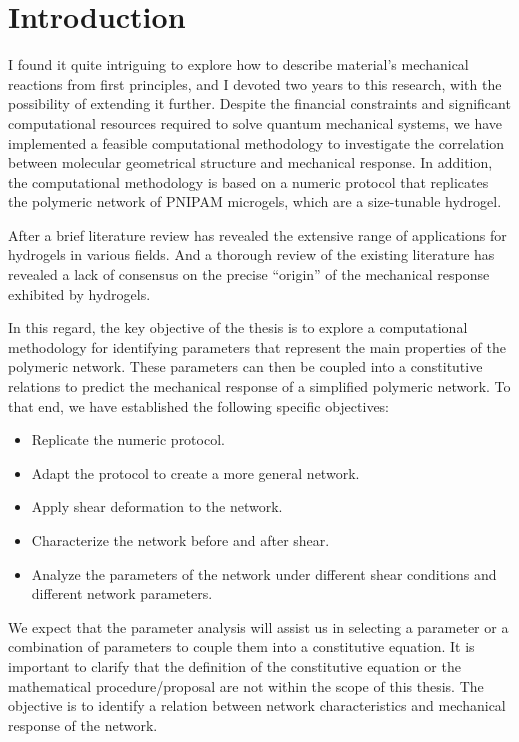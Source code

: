 \chapter{Introduction}\label{ch1:Intro}



I found it quite intriguing to explore how to describe material's mechanical reactions from first principles, and I devoted two years to this research, with the possibility of extending it further.
Despite the financial constraints and significant computational resources required to solve quantum mechanical systems, we have implemented a feasible computational methodology to investigate the correlation between molecular geometrical structure and mechanical response.
In addition, the computational methodology is based on a numeric protocol that replicates the polymeric network of PNIPAM microgels, which are a size-tunable hydrogel.

After a brief literature review has revealed the extensive range of applications for hydrogels in various fields.
And a thorough review of the existing literature has revealed a lack of consensus on the precise ``origin'' of the mechanical response exhibited by hydrogels.

In this regard, the key objective of the thesis is to explore a computational methodology for identifying parameters that represent the main properties of the polymeric network. 
These parameters can then be coupled into a constitutive relations to predict the mechanical response of a simplified polymeric network.
To that end, we have established the following specific objectives:
\begin{itemize}
    \item Replicate the numeric protocol.
    \item Adapt the protocol to create a more general network.
    \item Apply shear deformation to the network.
    \item Characterize the network before and after shear.
    \item Analyze the parameters of the network under different shear conditions and different network parameters.
\end{itemize}
We expect that the parameter analysis will assist us in selecting a parameter or a combination of parameters to couple them into a constitutive equation.
It is important to clarify that the definition of the constitutive equation or the mathematical procedure/proposal are not within the scope of this thesis. 
The objective is to identify a relation between network characteristics and mechanical response of the network.

